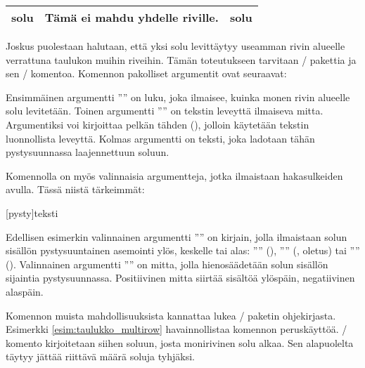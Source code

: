\begin{tulossis}
  \renewcommand{\arraystretch}{1.2}
  \begin{tabular}{|l|p{6.5em}|l|}
    \hline solu & Tämä ei mahdu yhdelle riville. & solu \\ \hline
  \end{tabular}
\end{tulossis}

Joskus puolestaan halutaan, että yksi solu levittäytyy useamman rivin
alueelle verrattuna taulukon muihin riveihin. Tämän toteutukseen
tarvitaan \-/ pakettia ja sen \-/
komentoa. Komennon pakolliset argumentit ovat seuraavat:

\begin{koodilohkosis}
\end{koodilohkosis}

Ensimmäinen argumentti '''' on luku, joka ilmaisee, kuinka
monen rivin alueelle solu levitetään. Toinen argumentti
'''' on tekstin leveyttä ilmaiseva mitta. Argumentiksi voi
kirjoittaa pelkän tähden (\koodi{*}), jolloin käytetään tekstin
luonnollista leveyttä. Kolmas argumentti on teksti, joka ladotaan tähän
pystysuunnassa laajennettuun soluun.

Komennolla on myös valinnaisia argumentteja, jotka ilmaistaan
hakasulkeiden avulla. Tässä niistä tärkeimmät:

\begin{koodilohkosis}
[pysty]{teksti}
\end{koodilohkosis}

Edellisen esimerkin valinnainen argumentti '''' on
kirjain, jolla ilmaistaan solun sisällön pystysuuntainen asemointi ylös,
keskelle tai alas: '''' (), ''''
(, oletus) tai '''' ().
Valinnainen argumentti '''' on mitta, jolla hienosäädetään
solun sisällön sijaintia pystysuunnassa. Positiivinen mitta siirtää
sisältöä ylöspäin, negatiivinen alaspäin.

Komennon muista mahdollisuuksista kannattaa lukea \-/
paketin ohjekirjasta. Esimerkki \ref{esim:taulukko_multirow}
havainnollistaa komennon peruskäyttöä. \-/ komento
kirjoitetaan siihen soluun, josta monirivinen solu alkaa. Sen
alapuolelta täytyy jättää riittävä määrä soluja tyhjäksi.

